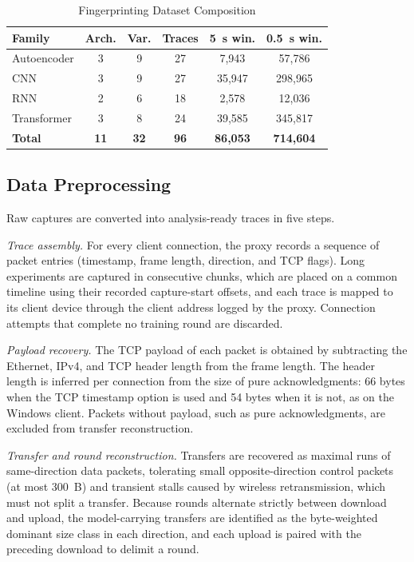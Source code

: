 \begin{table}[!htbp]
\centering
\caption{Fingerprinting Dataset Composition}
\label{tab:fp_dataset}
\scriptsize
\renewcommand{\arraystretch}{1.05}
\setlength{\tabcolsep}{4pt}
\begin{tabular}{lccccc}
\hline
\textbf{Family} & \textbf{Arch.} & \textbf{Var.} & \textbf{Traces} &
\textbf{5~s win.} & \textbf{0.5~s win.} \\
\hline
Autoencoder & 3  & 9  & 27 & 7{,}943  & 57{,}786 \\
CNN         & 3  & 9  & 27 & 35{,}947 & 298{,}965 \\
RNN         & 2  & 6  & 18 & 2{,}578  & 12{,}036 \\
Transformer & 3  & 8  & 24 & 39{,}585 & 345{,}817 \\
\hline
\textbf{Total} & \textbf{11} & \textbf{32} & \textbf{96} & \textbf{86{,}053} & \textbf{714{,}604} \\
\hline
\end{tabular}
\end{table}

\subsection{Data Preprocessing}
\label{subsec:preprocessing}
Raw captures are converted into analysis-ready traces in five steps.

\emph{Trace assembly.} For every client connection, the proxy records a sequence
of packet entries (timestamp, frame length, direction, and TCP flags). Long
experiments are captured in consecutive chunks, which are placed on a common
timeline using their recorded capture-start offsets, and each trace is mapped to
its client device through the client address logged by the proxy. Connection
attempts that complete no training round are discarded.

\emph{Payload recovery.} The TCP payload of each packet is obtained by
subtracting the Ethernet, IPv4, and TCP header length from the frame length.
The header length is inferred per connection from the size of pure
acknowledgments: 66 bytes when the TCP timestamp option is used and 54 bytes
when it is not, as on the Windows client.
Packets without payload, such as pure acknowledgments, are excluded from
transfer reconstruction.

\emph{Transfer and round reconstruction.} Transfers are recovered as maximal
runs of same-direction data packets, tolerating small opposite-direction control
packets (at most 300~B) and transient stalls caused by wireless retransmission,
which must not split a transfer. Because rounds alternate strictly between
download and upload, the model-carrying transfers are identified as the
byte-weighted dominant size class in each direction, and each upload is paired
with the preceding download to delimit a round.

